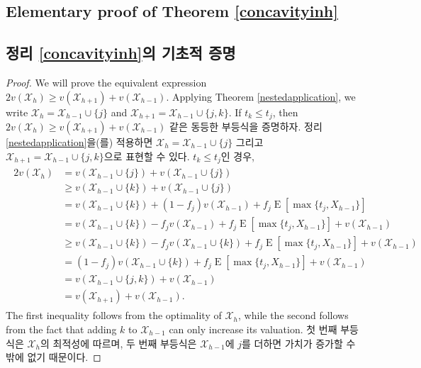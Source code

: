 \documentclass[11pt]{article} %
\theoremstyle{definition}
\theoremstyle{definition}
\begin{document}
\ifen \subsection{Elementary proof of Theorem \ref{concavityinh}} \else \subsection{정리 \ref{concavityinh}의 기초적 증명} \fi \label{elementaryconcavityproof}
\begin{proof}
\ifen We will prove the equivalent expression $2 v(\mathcal{X}_h) \geq v(\mathcal{X}_{h+1}) + v(\mathcal{X}_{h-1})$. Applying Theorem \ref{nestedapplication}, we write $\mathcal{X}_h = \mathcal{X}_{h-1} \cup\{j\}$ and $\mathcal{X}_{h+1} = \mathcal{X}_{h-1} \cup\{j, k\}$. If $t_k \leq t_j$, then 
\else $2 v(\mathcal{X}_h) \geq v(\mathcal{X}_{h+1}) + v(\mathcal{X}_{h-1})$ 같은 동등한 부등식을 증명하자. 정리 \ref{nestedapplication}을(를) 적용하면 $ \mathcal{X}_h = \mathcal{X}_{h-1} \cup\{j\}$ 그리고 $\mathcal{X}_{h+1} = \mathcal{X}_{h-1} \cup\{j, k\}$으로 표현할 수 있다. $t_k \leq t_j$인 경우, \fi
\begin{align}
\begin{split}
2 v(\mathcal{X}_h) &= v(\mathcal{X}_{h-1} \cup\{j\}) + v(\mathcal{X}_{h-1} \cup\{j\}) \\
&\geq v(\mathcal{X}_{h-1} \cup\{k\}) + v(\mathcal{X}_{h-1} \cup\{j\}) \\
&= v(\mathcal{X}_{h-1} \cup\{k\}) + (1 - f_j) v(\mathcal{X}_{h-1}) + f_j \operatorname{E}[\max\{t_j, X_{h-1}\}] \\
&= v(\mathcal{X}_{h-1} \cup\{k\}) - f_j v(\mathcal{X}_{h-1}) + f_j \operatorname{E}[\max\{t_j, X_{h-1}\}] + v(\mathcal{X}_{h-1})  \\
&\geq v(\mathcal{X}_{h-1} \cup\{k\})  - f_j v(\mathcal{X}_{h-1}\cup\{k\}) + f_j \operatorname{E}[\max\{t_j, X_{h-1}\}]+ v(\mathcal{X}_{h-1})\\
&= (1 - f_j) v(\mathcal{X}_{h-1} \cup\{k\})  + f_j \operatorname{E}[\max\{t_j, X_{h-1}\}]+ v(\mathcal{X}_{h-1})\\
&=  v(\mathcal{X}_{h-1} \cup\{j, k\}) + v(\mathcal{X}_{h-1})\\
&=  v(\mathcal{X}_{h+1}) + v(\mathcal{X}_{h-1}).
\end{split} 
\end{align}
\ifen The first inequality follows from the optimality of $\mathcal{X}_h$, while the second follows from the fact that adding $k$ to $\mathcal{X}_{h-1}$ can only increase its valuation.
\else 첫 번째 부등식은 $\mathcal{X}_h$의 최적성에 따르며, 두 번째 부등식은 $\mathcal{X}_{h-1}$에 $j$를 더하면 가치가 증가할 수밖에 없기 때문이다.\fi


\end{proof}
\end{document}
